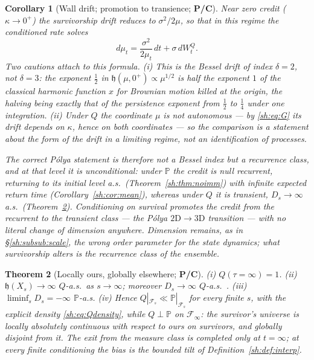 \documentclass[11pt]{article}
\numberwithin{equation}{section}
\theoremstyle{plain}
\newtheorem{theorem}{Theorem}[section]
\newtheorem{corollary}[theorem]{Corollary}
\theoremstyle{definition}
\theoremstyle{remark}
\newcommand{\PP}{\mathbb{P}}
\newcommand{\Fc}{\mathcal{F}}
\newcommand{\hm}{\mathfrak{h}}
\begin{document}
\begin{corollary}[Wall drift; promotion to transience; \textbf{P/C}]
\label{sh:cor:bessel}
Near zero credit ($\kappa\to0^+$) the survivorship drift reduces to
$\sigma^2/2\mu$, so that in this regime the conditioned rate solves
\[
d\mu_t=\frac{\sigma^2}{2\mu_t}\,dt+\sigma\,dW^Q_t .
\]
Two cautions attach to this formula.
\emph{(i)} This is the Bessel drift of index $\delta=2$, not $\delta=3$:
the exponent $\tfrac12$ in $\hm(\mu,0^+)\propto\mu^{1/2}$ is half the
exponent $1$ of the classical harmonic function $x$ for Brownian motion
killed at the origin, the halving being exactly that of the persistence
exponent from $\tfrac12$ to $\tfrac14$ under one integration.
\emph{(ii)} Under $Q$ the coordinate $\mu$ is not autonomous --- by
\eqref{sh:eq:G} its drift depends on $\kappa$, hence on both coordinates
--- so the comparison is a statement about the \emph{form} of the drift in
a limiting regime, not an identification of processes.

The correct P\'olya statement is therefore not a Bessel index but a
recurrence class, and at that level it is unconditional: under $\PP$ the
credit is null recurrent, returning to its initial level a.s.\
(Theorem~\ref{sh:thm:noimm}) with infinite expected return time
(Corollary~\ref{sh:cor:mean}), whereas under $Q$ it is transient,
$D_s\to\infty$ a.s.\ (Theorem~\ref{sh:thm:singular}). Conditioning on
survival promotes the credit from the recurrent to the transient class ---
the P\'olya $2\mathrm{D}\to3\mathrm{D}$ transition --- with no literal
change of dimension anywhere. Dimension remains, as in
\S\ref{sh:subsub:scale}, the wrong order parameter for the state dynamics;
what survivorship alters is the recurrence class of the \emph{ensemble}.
\end{corollary}

\begin{theorem}[Locally ours, globally elsewhere; \textbf{P/C}]
\label{sh:thm:singular}
\emph{(i)} $Q(\tau=\infty)=1$.
\emph{(ii)} $\hm(X_s)\to\infty$ $Q$-a.s.\ as $s\to\infty$; moreover
$D_s\to\infty$ $Q$-a.s.\ \cite{GJW99}.
\emph{(iii)} $\liminf_sD_s=-\infty$ $\PP$-a.s.
\emph{(iv)} Hence $Q|_{\Fc_s}\ll\PP|_{\Fc_s}$ for every finite $s$, with
the explicit density \eqref{sh:eq:Qdensity}, while $Q\perp\PP$ on
$\Fc_\infty$: the survivor's universe is locally absolutely continuous
with respect to ours on survivors, and globally disjoint from it. The
exit from the measure class is completed only at $t=\infty$; at every
finite conditioning the bias is the bounded tilt of
Definition~\ref{sh:def:interp}.
\end{theorem}
\end{document}
